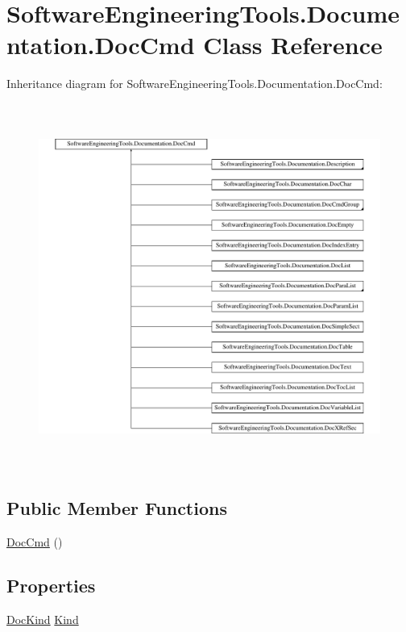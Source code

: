 \hypertarget{class_software_engineering_tools_1_1_documentation_1_1_doc_cmd}{\section{Software\+Engineering\+Tools.\+Documentation.\+Doc\+Cmd Class Reference}
\label{class_software_engineering_tools_1_1_documentation_1_1_doc_cmd}
}
Inheritance diagram for Software\+Engineering\+Tools.\+Documentation.\+Doc\+Cmd\+:\begin{figure}[H]
\begin{center}
\leavevmode
\includegraphics[height=12.000000cm]{class_software_engineering_tools_1_1_documentation_1_1_doc_cmd}
\end{center}
\end{figure}
\subsection*{Public Member Functions}
\begin{DoxyCompactItemize}
\item 
\hyperlink{class_software_engineering_tools_1_1_documentation_1_1_doc_cmd_aa5883c5254fa81621eb08bf6dcb6d676}{Doc\+Cmd} ()
\end{DoxyCompactItemize}
\subsection*{Properties}
\begin{DoxyCompactItemize}
\item 
\hyperlink{namespace_software_engineering_tools_1_1_documentation_ae0bccf4f49a76db084c1c316e5954ec9}{Doc\+Kind} \hyperlink{class_software_engineering_tools_1_1_documentation_1_1_doc_cmd_a85998cc3f4e34b4fbd9c825ffd1f72b5}{Kind}
\end{DoxyCompactItemize}



